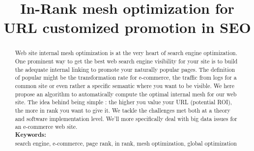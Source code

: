 \documentclass{iSWAGArticle}
\title{In-Rank mesh optimization for URL customized promotion in SEO}
\author{\iSWAGAuthor{Stefan Duprey\\
Cdiscount\\
stefan.duprey@cdiscount.com} \and \iSWAGAuthor{Second Author\\
Second University\\
second.author@university2.com}}
\begin{document}
\maketitle

\begin{abstract}
 Web site internal mesh optimization is at the very heart of search engine optimization. 
 One prominent way to get the best web search engine visibility for your site 
 is to build the adequate internal linking to promote your naturally popular pages. 
 The definition of popular might be the transformation rate for e-commerce, 
 the traffic from logs for a common site or even rather a specific semantic where you want to be visible. 
 We here propose an algorithm to automatically compute the optimal internal mesh for our web site. The idea
 behind being simple : the higher you value your URL (potential ROI), the more in rank you want to give it.
 We tackle the challenges met both at a theory and software implementation level. 
 We'll more specifically deal with big data issues for an e-commerce web site.
 \\\newline
 \indent \textbf{Keywords: }
 \\\newline
search engine, e-commerce, page rank, in rank, mesh optimization, global optimization
\end{abstract}
\end{document}
